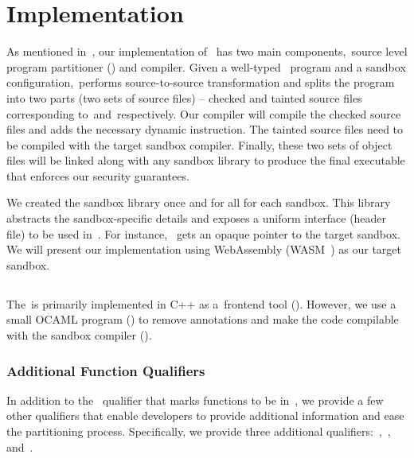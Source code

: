 \section{Implementation} \label{sec:implementation}
As mentioned in~, our implementation of~\systemname{} has two main components,~\ie source level program partitioner (\sourcerewriter) and compiler.
Given a well-typed~\systemname{} program and a sandbox configuration,~\sourcerewriter performs source-to-source transformation and splits the program into two parts (\ie two sets of source files) -- checked and tainted source files corresponding to~\cregion and~\ucregion respectively.
Our compiler will compile the checked source files and adds the necessary dynamic instruction.
The tainted source files need to be compiled with the target sandbox compiler.
Finally, these two sets of object files will be linked along with any sandbox library to produce the final executable that enforces our security guarantees.

We created the sandbox library once and for all for each sandbox.
This library abstracts the sandbox-specific details and exposes a uniform interface (header file) to be used in~\cregion.
For instance,~ gets an opaque pointer to the target sandbox.
We will present our implementation using WebAssembly (WASM~\cite{bosamiya2020webassembly}) as our target sandbox.

\subsection{\sourcerewriter} \label{subsec:checkmate}
The~\sourcerewriter is primarily implemented in C++ as a~\clang frontend tool (\numcheckmatelines{}).
However, we use a small OCAML program (\numocamllines{}) to remove annotations and make the code compilable with the sandbox compiler ().

\subsubsection{Additional Function Qualifiers}
\label{subsubsec:addfuncqual}
In addition to the~ qualifier that marks functions to be in~\ucregion, we provide a few other qualifiers that enable developers to provide additional information and ease the partitioning process.
Specifically, we provide three additional qualifiers:~,~, and~.

